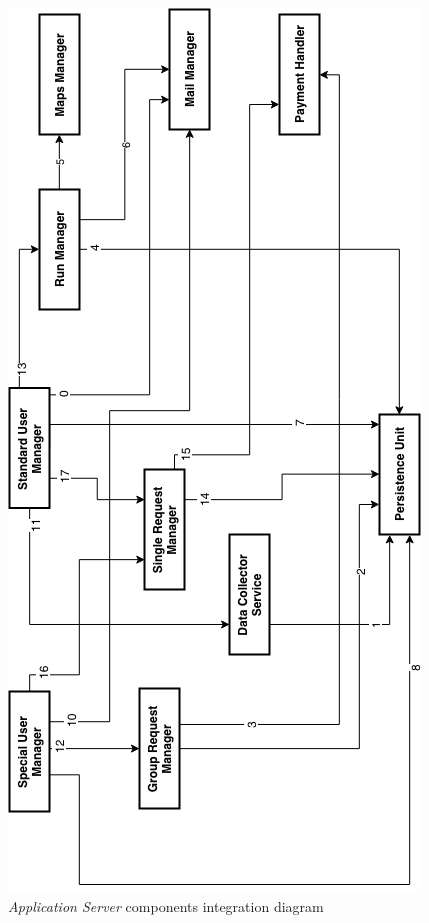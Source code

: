 \begin{figure}[H]
  \begin{center}
  	\includegraphics[width=\textwidth]{./img/appServerIntegration.png}
    \hspace{0.05\linewidth}
    \centering
    \caption{\textit{Application Server} components integration diagram}
		\label{img:appServerIntegrationDiagram}
    \end{center}
\end{figure}


